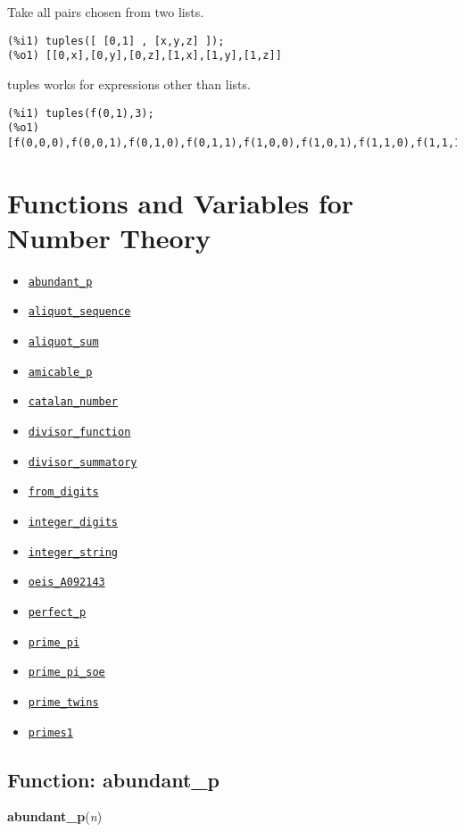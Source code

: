 \documentclass[]{article}
\begin{document}
   Take all pairs chosen from two lists. 

\begin{Verbatim}[frame=single]
(%i1) tuples([ [0,1] , [x,y,z] ]);
(%o1) [[0,x],[0,y],[0,z],[1,x],[1,y],[1,z]]
\end{Verbatim}

   tuples works for expressions other than lists. 

\begin{Verbatim}[frame=single]
(%i1) tuples(f(0,1),3);
(%o1) [f(0,0,0),f(0,0,1),f(0,1,0),f(0,1,1),f(1,0,0),f(1,0,1),f(1,1,0),f(1,1,1)]
\end{Verbatim}


\section{Functions and Variables for Number Theory}
\begin{itemize}
\item \hyperlink{abundant_p}{{\tt abundant\_p}}
\item \hyperlink{aliquot_sequence}{{\tt aliquot\_sequence}}
\item \hyperlink{aliquot_sum}{{\tt aliquot\_sum}}
\item \hyperlink{amicable_p}{{\tt amicable\_p}}
\item \hyperlink{catalan_number}{{\tt catalan\_number}}
\item \hyperlink{divisor_function}{{\tt divisor\_function}}
\item \hyperlink{divisor_summatory}{{\tt divisor\_summatory}}
\item \hyperlink{from_digits}{{\tt from\_digits}}
\item \hyperlink{integer_digits}{{\tt integer\_digits}}
\item \hyperlink{integer_string}{{\tt integer\_string}}
\item \hyperlink{oeis_A092143}{{\tt oeis\_A092143}}
\item \hyperlink{perfect_p}{{\tt perfect\_p}}
\item \hyperlink{prime_pi}{{\tt prime\_pi}}
\item \hyperlink{prime_pi_soe}{{\tt prime\_pi\_soe}}
\item \hyperlink{prime_twins}{{\tt prime\_twins}}
\item \hyperlink{primes1}{{\tt primes1}}
\end{itemize}
\subsection{Function: abundant\_p\label{sec:abundant_p}}
\hypertarget{abundant_p}{}
{\bf abundant\_p}({\it n})
\end{document}
